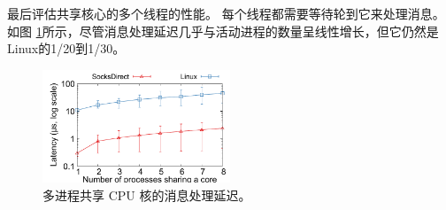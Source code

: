 

最后评估共享核心的多个线程的性能。 每个线程都需要等待轮到它来处理消息。
如图 \ref {socksdirect:fig:eval-context-switch}所示，尽管消息处理延迟几乎与活动进程的数量呈线性增长，但它仍然是Linux的1/20到1/30。


\begin{figure}[htbp]
	
	\centering \includegraphics[width=0.5\textwidth]{eval/microbenchmark/sharecore-lat.pdf}
	
	\caption{多进程共享 CPU 核的消息处理延迟。}
	\label{socksdirect:fig:eval-context-switch}
\end{figure}



